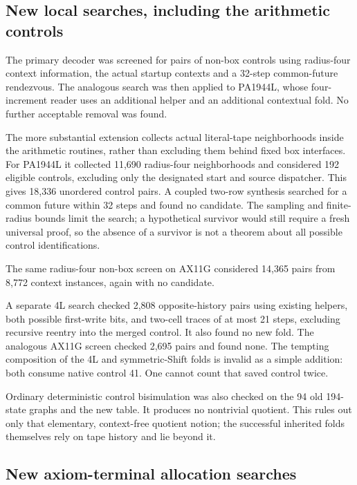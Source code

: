 \documentclass[11pt,letterpaper]{article}
\begin{document}
\subsection{New local searches, including the arithmetic controls}

The primary decoder was screened for pairs of non-box controls using
radius-four context information, the actual startup contexts and a
32-step common-future rendezvous. The analogous search was then applied
to PA1944L, whose four-increment reader uses an additional helper and an
additional contextual fold. No further acceptable removal was found.

The more substantial extension collects actual literal-tape neighborhoods
inside the arithmetic routines, rather than excluding them behind fixed
box interfaces. For PA1944L it collected 11,690 radius-four neighborhoods
and considered 192 eligible controls, excluding only the designated start
and source dispatcher. This gives 18,336 unordered control pairs. A
coupled two-row synthesis searched for a common future within 32 steps
and found no candidate. The sampling and finite-radius bounds limit the
search; a hypothetical survivor would still require a fresh universal
proof, so the absence of a survivor is not a theorem about all possible
control identifications.

The same radius-four non-box screen on AX11G considered 14,365 pairs
from 8,772 context instances, again with no candidate.

A separate 4L search checked 2,808 opposite-history pairs using existing
helpers, both possible first-write bits, and two-cell traces of at most
21 steps, excluding recursive reentry into the merged control. It also
found no new fold. The analogous AX11G screen checked 2,695 pairs and
found none. The tempting composition of the 4L and symmetric-Shift
folds is invalid as a simple addition: both consume native control 41.
One cannot count that saved control twice.

Ordinary deterministic control bisimulation was also checked on the 94
old 194-state graphs and the new table. It produces no nontrivial quotient.
This rules out only that elementary, context-free quotient notion; the
successful inherited folds themselves rely on tape history and lie beyond it.

\subsection{New axiom-terminal allocation searches}
\end{document}
